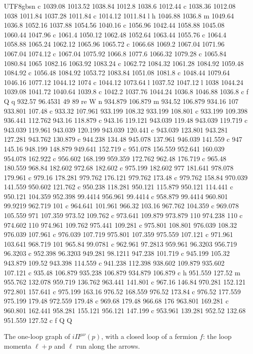 \documentclass[11pt,a4paper,oneside]{report}
\begin{document}
\begin{CJK*}{UTF8}{gbsn}
{c 1039.08 1013.52 1038.84 1012.8 1038.6 1012.44 c 1038.36 1012.08 1038 1011.84 1037.28 1011.84 c 1014.12
1011.84 l h 1046.88 1036.8 m 1049.64 1036.8 1052.16 1037.88 1054.56 1040.16 c 1056.96 1042.44 1058.88
1045.08 1060.44 1047.96 c 1061.4 1050.12 1062.48 1052.64 1063.44 1055.76 c 1064.4 1058.88 1065.24 1062.12
1065.96 1065.72 c 1066.68 1069.2 1067.04 1071.96 1067.04 1074.12 c 1067.04 1075.92 1066.8 1077.6 1066.32
1079.28 c 1065.84 1080.84 1065 1082.16 1063.92 1083.24 c 1062.72 1084.32 1061.28 1084.92 1059.48 1084.92
c 1056.48 1084.92 1053.72 1083.84 1051.08 1081.8 c 1048.44 1079.64 1046.16 1077.12 1044.12 1074 c 1044.12
1073.64 l 1037.52 1047.12 l 1038 1044.24 1039.08 1041.72 1040.64 1039.8 c 1042.2 1037.76 1044.24 1036.8
1046.88 1036.8 c f Q q 932.57 96.4531 49 89 re W n 934.879 106.879 m 934.52 106.879 934.16 107 933.801
107.48 c 933.32 107.961 933.199 108.32 933.199 108.801 c 933.199 109.398 936.441 112.762 943.16 118.879 c
943.16 119.121 943.039 119.48 943.039 119.719 c 943.039 119.961 943.039 120.199 943.039 120.441 c 943.039
123.801 943.281 127.281 943.762 130.879 c 944.238 134.48 945.078 137.961 946.039 141.559 c 947 145.16
948.199 148.879 949.641 152.719 c 951.078 156.559 952.641 160.039 954.078 162.922 c 956.602 168.199
959.359 172.762 962.48 176.719 c 965.48 180.559 968.84 182.602 972.68 182.602 c 975.199 182.602 977
181.641 978.078 179.961 c 979.16 178.281 979.762 176.121 979.762 173.48 c 979.762 158.84 970.039 141.559
950.602 121.762 c 950.238 118.281 950.121 115.879 950.121 114.441 c 950.121 104.359 952.398 99.4414
956.961 99.4414 c 958.879 99.4414 960.801 99.9219 962.719 101 c 964.641 101.961 966.32 103.16 967.762
104.359 c 969.078 105.559 971 107.359 973.52 109.762 c 973.641 109.879 973.879 110 974.238 110 c 974.602
110 974.961 109.762 975.441 109.281 c 975.801 108.801 976.039 108.32 976.039 107.961 c 976.039 107.719
975.801 107.359 975.559 107.121 c 971.961 103.641 968.719 101 965.84 99.0781 c 962.961 97.2813 959.961
96.3203 956.719 96.3203 c 952.398 96.3203 949.281 98.1211 947.238 101.719 c 945.199 105.32 943.879 109.52
943.398 114.559 c 941.238 112.398 938.602 109.879 935.602 107.121 c 935.48 106.879 935.238 106.879
934.879 106.879 c h 951.559 127.52 m 955.762 132.078 959.719 136.762 963.441 141.801 c 967.16 146.84
970.281 152.121 972.801 157.641 c 975.199 163.16 976.52 168.559 976.52 173.84 c 976.52 177.559 975.199
179.48 972.559 179.48 c 969.68 179.48 966.68 176 963.801 169.281 c 960.801 162.441 958.281 155.121
956.121 147.199 c 953.961 139.281 952.52 132.68 951.559 127.52 c f Q Q
}

The one-loop graph of $i\Pi^{\mu\nu}(p)$, with a closed loop of a fermion $f$: the loop momenta $\ell+p$ and $\ell$ run along the arrows.


\end{CJK*}
\end{document}

